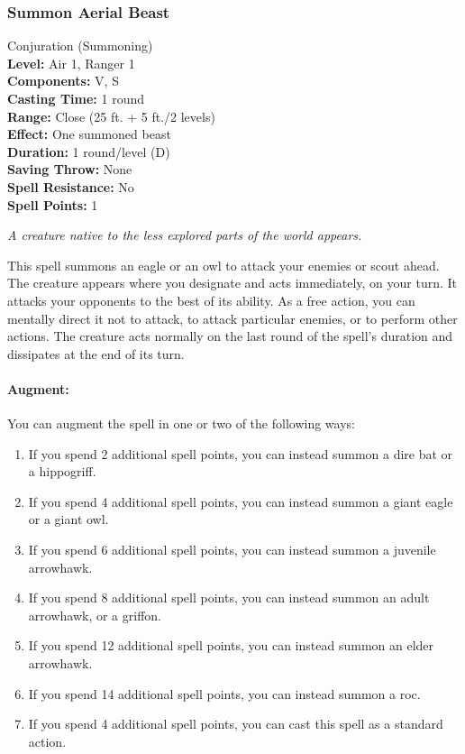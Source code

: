 \subsubsection{Summon Aerial Beast}
\label{Spell:SummonAerialBeast}
Conjuration (Summoning)
\\ \textbf{Level:} Air 1, Ranger 1
\\ \textbf{Components:} V, S
\\ \textbf{Casting Time:} 1 round
\\ \textbf{Range:} Close (25 ft. + 5 ft./2 levels)
\\ \textbf{Effect:} One summoned beast
\\ \textbf{Duration:} 1 round/level (D)
\\ \textbf{Saving Throw:} None
\\ \textbf{Spell Resistance:} No
\\ \textbf{Spell Points:} 1

\emph{A creature native to the less explored parts of the world appears.}

This spell summons an eagle or an owl to attack your enemies or scout ahead.
The creature appears where you designate and acts immediately, on your turn. 
It attacks your opponents to the best of its ability. 
As a free action, you can mentally direct it not to attack, to attack particular enemies, or to perform other actions. 
The creature acts normally on the last round of the spell's duration and dissipates at the end of its turn.

\paragraph{Augment:} You can augment the spell in one or two of the following ways: 
\begin{enumerate}
 \item If you spend 2 additional spell points, you can instead summon a dire bat or a hippogriff.
 \item If you spend 4 additional spell points, you can instead summon a giant eagle or a giant owl.
 \item If you spend 6 additional spell points, you can instead summon a juvenile arrowhawk.
 \item If you spend 8 additional spell points, you can instead summon an adult arrowhawk, or a griffon.
 \item If you spend 12 additional spell points, you can instead summon an elder arrowhawk.
 \item If you spend 14 additional spell points, you can instead summon a roc.
 \item If you spend 4 additional spell points, you can cast this spell as a standard action.
\end{enumerate}
